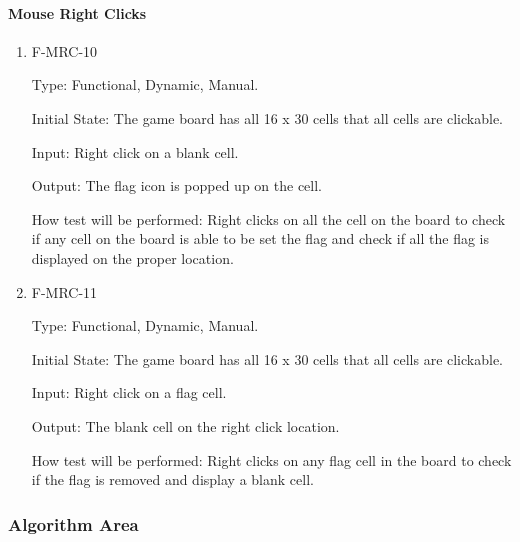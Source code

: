 \documentclass[12pt, titlepage]{article}
\begin{document}
\paragraph{Mouse Right Clicks}
\begin{enumerate}
\item{F-MRC-10\\}

Type: Functional, Dynamic, Manual.
					
Initial State: The game board has all 16 x 30 cells that all cells are clickable.
					
Input: Right click on a blank cell.
					
Output: The flag icon is popped up on the cell.
					
How test will be performed: Right clicks on all the cell on the board to check if any cell on the board is able to be set the flag and check if all the flag is displayed on the proper location.

\item{F-MRC-11\\}

Type: Functional, Dynamic, Manual.
					
Initial State: The game board has all 16 x 30 cells that all cells are clickable.
					
Input: Right click on a flag cell.
					
Output: The blank cell on the right click location.
					
How test will be performed: Right clicks on any flag cell in the board to check if the flag is removed and display a blank cell.

\end{enumerate}
\subsubsection{Algorithm Area}
\end{document}
